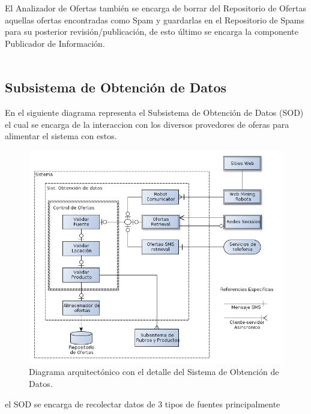El \textsf{Analizador de Ofertas} también se encarga de borrar del \textsf{Repositorio de Ofertas} aquellas ofertas encontradas como Spam y guardarlas en el \textsf{Repositorio de Spams} para su posterior revisión/publicación, de esto último se encarga la componente \textsf{Publicador de Información}.\\


\\


\subsection{Subsistema de Obtención de Datos}

En el siguiente diagrama representa el Subsistema de Obtención de Datos (\textsf{SOD}) el cual se encarga de la interaccion con los diversos provedores de oferas para alimentar el sistema con estos.

\begin{figure}[H]
	\centering
	\includegraphics[width=\textwidth]{graficos/arch/Sistema_obtenedor_datos.png}
	\caption{Diagrama arquitectónico con el detalle del \textsf{Sistema de Obtención de Datos}.}
\end{figure}

el SOD se encarga de recolectar datos de 3 tipos de fuentes principalmente



\\
\\
\\

